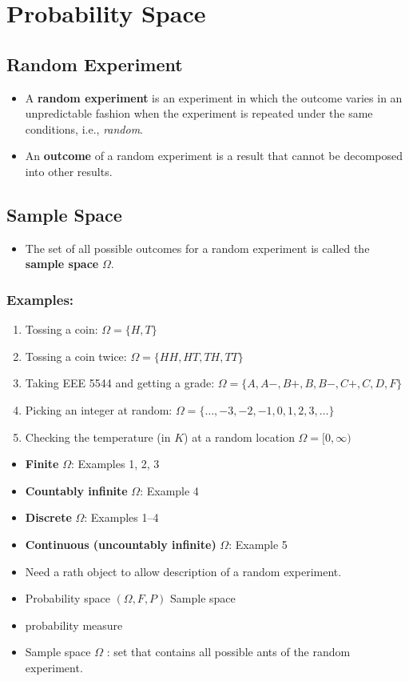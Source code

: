 \section{Probability Space}

\subsection{Random Experiment}
\begin{itemize}
\item A \textbf{random experiment} is an experiment in which the
outcome varies in an unpredictable fashion when the experiment is
repeated under the same conditions, i.e., \emph{random}.
\item An \textbf{outcome} of a random experiment is a result that
cannot be decomposed into other results.
\end{itemize}

\subsection{Sample Space}
\begin{itemize}
\item The set of all possible outcomes for a random experiment is
called the \textbf{sample space} \(\Omega\).
\end{itemize}

\subsubsection{Examples:}
\begin{enumerate}
\item Tossing a coin: \(\Omega=\{H, T\}\)
\item Tossing a coin twice: \(\Omega=\{H H, H T, T H, T T\}\)
\item Taking EEE 5544 and getting a grade:
\(
\Omega=\{A, A-, B+, B, B-, C+, C, D, F\}
\)
\item Picking an integer at random:
\(\Omega=\{\ldots,-3,-2,-1,0,1,2,3, \ldots \}\)
\item Checking the temperature (in $K$) at a random location
\(
\Omega=[0, \infty)
\)
\end{enumerate}

\begin{itemize}
\item \textbf{Finite} \(\Omega\): Examples 1, 2, 3
\item \textbf{Countably infinite} \(\Omega\): Example 4
\item \textbf{Discrete} \(\Omega\):  Examples 1--4
\item \textbf{Continuous (uncountably infinite)} \(\Omega\):  Example
5
\end{itemize}



\begin{itemize}
  \item[-] Need a rath object to allow description of a random experiment.
  \item[-] Probability space \((\Omega, F, P)\) Sample space
  \item[] probability measure
  \item[-] Sample space \(\Omega\) : set that contains all possible ants of the random experiment.
\end{itemize}
